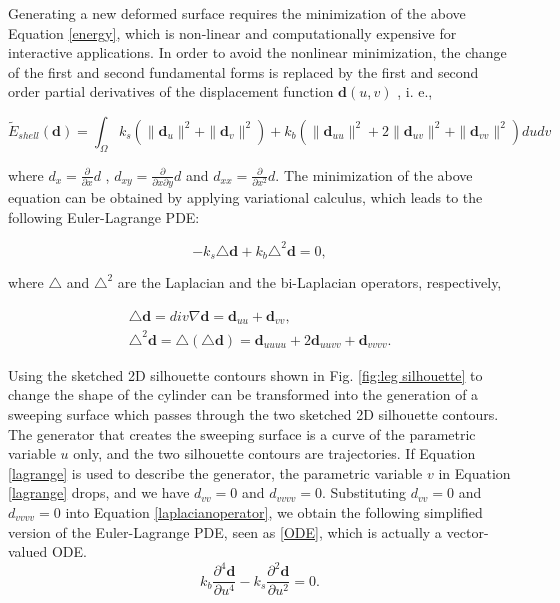 \documentclass[runningheads]{llncs}
\begin{document}
Generating a new deformed surface requires the minimization of the above Equation \eqref{energy}, which is non-linear and computationally expensive for interactive applications. In order to avoid the nonlinear minimization, the change of the first and second fundamental forms is replaced by the first and second order partial derivatives of the displacement function $\textbf{d}(u, v)$ \cite{celniker1991deformable,welch1992variational}, i. e.,

\begin{equation}
    \tilde{E}_{shell}(\mathbf{d})=\int_{\Omega}k_s(\|\mathbf{d}_u\|^2+\|\mathbf{d}_v\|^2)+k_b(\|\mathbf{d}_{uu}\|^2+2\|\mathbf{d}_{uv}\|^2+\|\mathbf{d}_{vv}\|^2) dudv
    \label{energydiffgeo}  
\end{equation}

where $ d_{x}=\frac{\partial}{\partial x}d$ , $d_{xy}=\frac{\partial}{\partial x \partial y }d$ and $d_{xx}=\frac{\partial}{\partial {x^2}}d$. 
The minimization of the above equation can be obtained by applying variational calculus, which leads to the following Euler-Lagrange PDE:

\begin{equation}
     -k_s\triangle \mathbf{d}+k_b\triangle^2\mathbf{d}=0,    
    \label{lagrange}     
\end{equation}

where $\triangle$ and $\triangle ^ {2}$ are the Laplacian and the bi-Laplacian operators, respectively,

\begin{equation}
\begin{split}
    \triangle \mathbf{d}=div\nabla \mathbf{d}=\mathbf{d}_{uu}+\mathbf{d}_{vv}, \\  \triangle^2\mathbf{d}=\triangle(\triangle \mathbf{d}) =\mathbf{d}_{uuuu}+2\mathbf{d}_{uuvv}+\mathbf{d}_{vvvv}.
\end{split}
\label{laplacianoperator}   
\end{equation}

Using the sketched 2D silhouette contours shown in Fig. \ref{fig:leg silhouette} to change the shape of the cylinder can be transformed into the generation of a sweeping surface which passes through the two sketched 2D silhouette contours. The generator that creates the sweeping surface is a curve of the parametric variable $u$ only, and the two silhouette contours are trajectories. If Equation \eqref{lagrange} is used to describe the generator, the parametric variable $v$ in Equation \eqref{lagrange} drops, and we have $d_{vv} = 0$ and $d_{vvvv} = 0$. Substituting $d_{vv} = 0$ and $d_{vvvv} = 0$ into Equation \eqref{laplacianoperator}, we obtain the following simplified version of the Euler-Lagrange PDE, seen as \eqref{ODE}, which is actually a vector-valued ODE.
\begin{equation}
k_b\frac{\partial^4\mathbf{d}}{\partial u^4}-k_s\frac{\partial^2 \mathbf{d}}{\partial u^2}=0.
\label{ODE}    
\end{equation}
\end{document}
